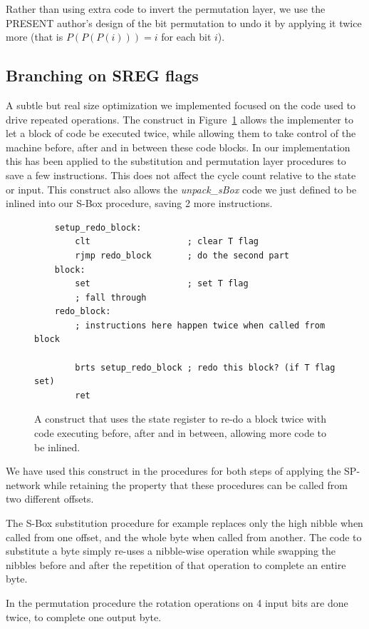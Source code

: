 \documentclass[11pt]{article}
\begin{document}
Rather than using extra code to invert the permutation layer, we use the PRESENT author's design of the bit permutation to undo it by applying it twice more (that is $P(P(P(i))) = i$ for each bit $i$).

\subsection{Branching on SREG flags}
A subtle but real size optimization we implemented focused on the code used to drive repeated operations.
The construct in Figure~\ref{sreg_redo} allows the implementer to let a block of code be executed twice, while allowing them to take control of the machine before, after and in between these code blocks.
In our implementation this has been applied to the substitution and permutation layer procedures to save a few instructions.
This does not affect the cycle count relative to the state or input.
This construct also allows the \textit{unpack\_sBox} code we just defined to be inlined into our S-Box procedure, saving 2 more instructions.

\begin{figure}
	\begin{lstlisting}
	setup_redo_block:
		clt                   ; clear T flag
		rjmp redo_block       ; do the second part
	block:
		set                   ; set T flag
		; fall through
	redo_block:
		; instructions here happen twice when called from block

		brts setup_redo_block ; redo this block? (if T flag set)
		ret
	\end{lstlisting}
	\caption{\footnotesize A construct that uses the state register to re-do a block twice with code executing before, after and in between, allowing more code to be inlined.}
\label{sreg_redo}
\end{figure}

We have used this construct in the procedures for both steps of applying the SP-network while retaining the property that these procedures can be called from two different offsets.

The S-Box substitution procedure for example replaces only the high nibble when called from one offset, and the whole byte when called from another.
The code to substitute a byte simply re-uses a nibble-wise operation while swapping the nibbles before and after the repetition of that operation to complete an entire byte.

In the permutation procedure the rotation operations on 4 input bits are done twice, to complete one output byte.
\end{document}
